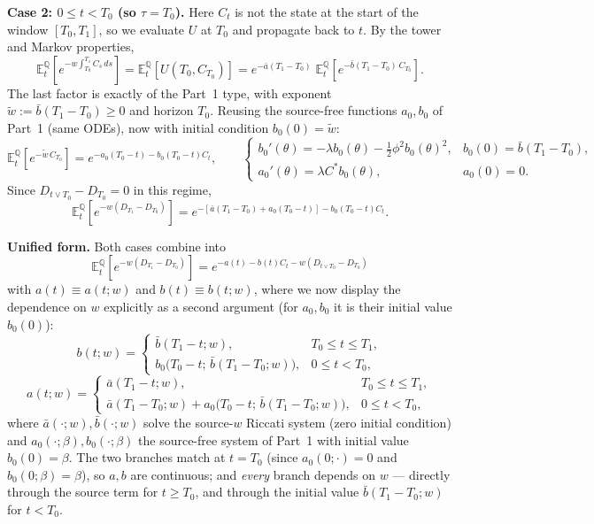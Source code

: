 \documentclass[12pt,a4paper]{article}
\begin{document}
\noindent\textbf{Case 2: $0 \le t < T_0$ (so $\tau = T_0$).} Here $C_t$ is not the state at the start of the window $[T_0,T_1]$, so we evaluate $U$ at $T_0$ and propagate back to $t$. By the tower and Markov properties,
\begin{equation*}
\mathbb{E}^{\mathbb{Q}}_t\!\left[e^{-w\int_{T_0}^{T_1}C_s\,ds}\right]
= \mathbb{E}^{\mathbb{Q}}_t\!\left[U(T_0,C_{T_0})\right]
= e^{-\bar a(T_1-T_0)}\;\mathbb{E}^{\mathbb{Q}}_t\!\left[e^{-\bar b(T_1-T_0)\,C_{T_0}}\right].
\end{equation*}
The last factor is exactly of the Part~1 type, with exponent $\tilde{w} := \bar b(T_1-T_0) \ge 0$ and horizon $T_0$. Reusing the source-free functions $a_0,b_0$ of Part~1 (same ODEs), now with initial condition $b_0(0) = \tilde{w}$:
\begin{equation*}
\mathbb{E}^{\mathbb{Q}}_t\!\left[e^{-\tilde{w}\,C_{T_0}}\right]
= e^{-a_0(T_0-t) - b_0(T_0-t)C_t},
\qquad
\begin{cases}
b_0'(\theta) = -\lambda b_0(\theta) - \tfrac{1}{2}\phi^2 b_0(\theta)^2, & b_0(0)=\bar b(T_1-T_0),\\[2pt]
a_0'(\theta) = \lambda C^* b_0(\theta), & a_0(0)=0.
\end{cases}
\end{equation*}
Since $D_{t\vee T_0}-D_{T_0}=0$ in this regime,
\begin{equation*}
\mathbb{E}^{\mathbb{Q}}_t\!\left[e^{-w(D_{T_1} - D_{T_0})}\right]
= e^{-\left[\bar a(T_1-T_0) + a_0(T_0-t)\right] - b_0(T_0-t)C_t}.
\end{equation*}

\noindent\textbf{Unified form.} Both cases combine into
\begin{equation*}
\boxed{\;\mathbb{E}^{\mathbb{Q}}_t\!\left[e^{-w(D_{T_1} - D_{T_0})}\right]
= e^{-a(t) - b(t)C_t - w(D_{t\vee T_0} - D_{T_0})}\;}
\end{equation*}
with $a(t)\equiv a(t;w)$ and $b(t)\equiv b(t;w)$, where we now display the dependence on $w$ explicitly as a second argument (for $a_0,b_0$ it is their initial value $b_0(0)$):
\begin{equation*}
b(t;w)=\begin{cases} \bar b(T_1-t;w), & T_0\le t\le T_1,\\[2pt] b_0\big(T_0-t;\,\bar b(T_1-T_0;w)\big), & 0\le t<T_0,\end{cases}
\end{equation*}
\begin{equation*}
a(t;w)=\begin{cases} \bar a(T_1-t;w), & T_0\le t\le T_1,\\[2pt] \bar a(T_1-T_0;w)+a_0\big(T_0-t;\,\bar b(T_1-T_0;w)\big), & 0\le t<T_0,\end{cases}
\end{equation*}
where $\bar a(\cdot;w),\bar b(\cdot;w)$ solve the source-$w$ Riccati system (zero initial condition) and $a_0(\cdot;\beta),b_0(\cdot;\beta)$ the source-free system of Part~1 with initial value $b_0(0)=\beta$. The two branches match at $t=T_0$ (since $a_0(0;\cdot)=0$ and $b_0(0;\beta)=\beta$), so $a,b$ are continuous; and \emph{every} branch depends on $w$ --- directly through the source term for $t\ge T_0$, and through the initial value $\bar b(T_1-T_0;w)$ for $t<T_0$.
\end{document}
